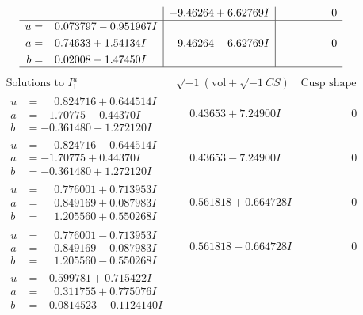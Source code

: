\documentclass[1p]{elsarticle_modified}
\theoremstyle{definition}
\newcommand{\I}{\sqrt{-1}}
\begin{document}
$$\begin{array}{c|c|c}
 & -9.46264 + 6.62769 I & \phantom{-0.000000 } 0 \\ \hline\begin{aligned}
u &= \phantom{-}0.073797 - 0.951967 I \\
a &= \phantom{-}0.74633 + 1.54134 I \\
b &= \phantom{-}0.02008 - 1.47450 I\end{aligned}
 & -9.46264 - 6.62769 I & \phantom{-0.000000 } 0\\
 \hline 
 \end{array}$$\newpage$$\begin{array}{c|c|c}  
\text{Solutions to }I^u_{1}& \I (\text{vol} + \sqrt{-1}CS) & \text{Cusp shape}\\
 \hline 
\begin{aligned}
u &= \phantom{-}0.824716 + 0.644514 I \\
a &= -1.70775 - 0.44370 I \\
b &= -0.361480 - 1.272120 I\end{aligned}
 & \phantom{-}0.43653 + 7.24900 I & \phantom{-0.000000 } 0 \\ \hline\begin{aligned}
u &= \phantom{-}0.824716 - 0.644514 I \\
a &= -1.70775 + 0.44370 I \\
b &= -0.361480 + 1.272120 I\end{aligned}
 & \phantom{-}0.43653 - 7.24900 I & \phantom{-0.000000 } 0 \\ \hline\begin{aligned}
u &= \phantom{-}0.776001 + 0.713953 I \\
a &= \phantom{-}0.849169 + 0.087983 I \\
b &= \phantom{-}1.205560 + 0.550268 I\end{aligned}
 & \phantom{-}0.561818 + 0.664728 I & \phantom{-0.000000 } 0 \\ \hline\begin{aligned}
u &= \phantom{-}0.776001 - 0.713953 I \\
a &= \phantom{-}0.849169 - 0.087983 I \\
b &= \phantom{-}1.205560 - 0.550268 I\end{aligned}
 & \phantom{-}0.561818 - 0.664728 I & \phantom{-0.000000 } 0 \\ \hline\begin{aligned}
u &= -0.599781 + 0.715422 I \\
a &= \phantom{-}0.311755 + 0.775076 I \\
b &= -0.0814523 - 0.1124140 I\end{aligned}

\end{array}$$
\end{document}
